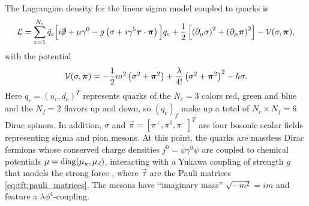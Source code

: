The Lagrangian density for the linear sigma model coupled to quarks is
\begin{equation}
	\mathcal{L} = \sum_{c=1}^{N_c} \bar{q}_c \Big[ i \slashed\partial + \mu \gamma^0 - g \left( \sigma + i \gamma^5 {\bm{\tau}} \cdot {\bm{\pi}} \right) \Big] q_c
	      + \frac12 \left[ \left( \partial_\mu \sigma \right)^2 + \left( \partial_\mu {\bm{\pi}} \right)^2 \right] - \mathcal{V}(\sigma,{\bm{\pi}}) ,
\label{eq:lsm:lagrangian}
\end{equation}
with the potential
\begin{equation}
	\mathcal{V}(\sigma,{\bm{\pi}}) = -\frac12 m^2 \left( \sigma^2 + {\bm{\pi}}^2 \right) + \frac{\lambda}{4!} \left( \sigma^2 + {\bm{\pi}}^2 \right)^2 - h \sigma .
\label{eq:lsm:potential}
\end{equation}
Here $q_c = (u_c, d_c)^T$ represents quarks of the $N_c = 3$ colors red, green and blue and the $N_f = 2$ flavors up and down, so $(q_c)_f$ make up a total of $N_c \times N_f = 6$ Dirac spinors.
In addition, $\sigma$ and $\vec\pi = [\pi^+, \pi^0, \pi^-]^T$ are four bosonic scalar fields representing sigma and pion mesons.
At this point, the quarks are massless Dirac fermions whose conserved charge densities $j^0 = \bar\psi \gamma^0 \psi$ are coupled to chemical potentials $\mu = \operatorname{diag}(\mu_u, \mu_d)$, interacting with a Yukawa coupling of strength $g$ that models the strong force , where $\vec\tau$ are the Pauli matrices \eqref{eq:tft:pauli_matrices}.
The mesons have ``imaginary mass'' $\sqrt{-m^2} = i m$ and feature a $\lambda \phi^4$-coupling.

